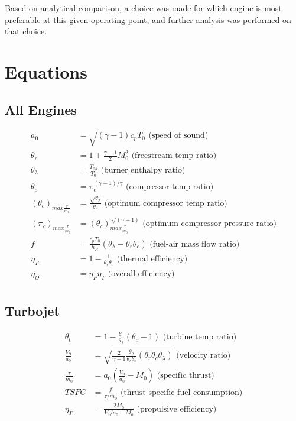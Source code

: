 \documentclass[]{aiaa-tc}%
\begin{document}
\noindent
Based on analytical comparison, a choice was made for which engine is most preferable at this given operating point, and further analysis was performed on that choice.

\section{Equations}

\subsection{All Engines}

\begin{align*}
	a_{0} &= \sqrt{(\gamma-1)c_{p}T_{0}} \text{ (speed of sound)}\\
	\theta_{r} &= 1 + \frac{\gamma-1}{2}M_{0}^{2} \text{ (freestream temp ratio)}\\
	\theta_{\lambda} &= \frac{T_{04}}{T_{0}} \text{ (burner enthalpy ratio)}\\
	\theta_{c} &= \pi_{c}^{(\gamma-1)/\gamma} \text{ (compressor temp ratio)}\\
	(\theta_{c})_{max\frac{\tau}{\dot{m}_{0}}} &= \frac{\sqrt{\theta_{\lambda}}}{\theta_{r}} 
		\text{ (optimum compressor temp ratio)}\\
	(\pi_{c})_{max\frac{\tau}{\dot{m}_{0}}} &= 
		(\theta_{c})_{max\frac{\tau}{\dot{m}_{0}}}^{\gamma/(\gamma-1)}
		\text{ (optimum compressor pressure ratio)}\\
	f &= \frac{c_{p}T_{0}}{h_{R}}(\theta_{\lambda}-\theta_{r}\theta_{c})
		\text{ (fuel-air mass flow ratio)}\\
	\eta_{T} &= 1 - \frac{1}{\theta_{r}\theta_{c}} \text{ (thermal efficiency)}\\	
	\eta_{O} &= \eta_{P}\eta_{T} \text{ (overall efficiency)}\\
\end{align*}

\subsection{Turbojet}

\begin{align*}
	\theta_{t} &= 1 - \frac{\theta_{r}}{\theta_{\lambda}}(\theta_{c}-1)
		\text{ (turbine temp ratio)}\\
	\frac{V_{9}}{a_{0}} &= \sqrt{\frac{2}{\gamma-1}\frac{\theta_{\lambda}}{\theta_{r}\theta_{c}}
		(\theta_{r}\theta_{c}\theta_{\lambda})} \text{ (velocity ratio)}\\
	\frac{\tau}{\dot{m}_{0}} &= a_{0}\left(\frac{V_{9}}{a_{0}}-M_{0}\right)
		\text{ (specific thrust)}\\
	TSFC &= \frac{f}{\tau/\dot{m}_{0}} \text{ (thrust specific fuel consumption)}\\
	\eta_{P} &= \frac{2M_{0}}{V_{9}/a_{0}+M_{0}} \text{ (propulsive efficiency)}\\	
\end{align*}
\end{document}
